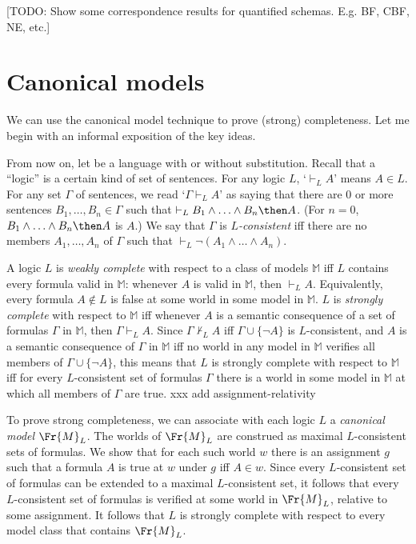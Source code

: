 \documentclass[11pt]{woarticle}
\theoremstyle{break}
\theoremstyle{nonumberplain}
\newcommand{\1}{\;\,|\;\,}
\begin{document}
[TODO: Show some correspondence results for quantified schemas. E.g. BF, CBF,
NE, etc.]




\section{Canonical models}\label{sec:canonical-models}

We can use the canonical model technique to prove (strong) completeness. Let me
begin with an informal exposition of the key ideas.

From now on, let  be a language with or without substitution. Recall that
a ``logic'' is a certain kind of set of sentences. For any logic $L$,
`$\vdash_{L} A$' means $A \in L$. For any set $\Gamma$ of sentences, we read
`$\Gamma \vdash_{L} A$' as saying that there are 0 or more sentences
$B_1,\ldots,B_n \in \Gamma$ such that
$\vdash_{L} B_1\land \ldots \land B_n \then A$. (For $n=0$,
$B_1\land\ldots \land B_n \then A$ is $A$.) We say that $\Gamma$ is
\emph{$L$-consistent} iff there are no members $A_1,\ldots,A_n$ of $\Gamma$ such
that $\vdash_L \neg (A_1 \land \ldots \land A_n)$.

A logic $L$ is \emph{weakly complete} with respect to a class of
models $\mathbb{M}$ iff $L$ contains every formula valid in
$\mathbb{M}$: whenever $A$ is valid in $\mathbb{M}$, then $\vdash_L
A$. Equivalently, every formula $A \not\in L$ is false at some world
in some model in $\mathbb{M}$.  $L$ is \emph{strongly complete} with
respect to $\mathbb{M}$ iff whenever $A$ is a semantic consequence of
a set of formulas $\Gamma$ in $\mathbb{M}$, then $\Gamma \vdash_L
A$. Since $\Gamma \not\vdash_L A$ iff $\Gamma \cup \{\neg A\}$ is
$L$-consistent, and $A$ is a semantic consequence of $\Gamma$ in
$\mathbb{M}$ iff no world in any model in $\mathbb{M}$ verifies all
members of $\Gamma \cup \{\neg A\}$, this means that $L$ is strongly
complete with respect to $\mathbb{M}$ iff for every $L$-consistent set
of formulas $\Gamma$ there is a world in some model in $\mathbb{M}$ at
which all members of $\Gamma$ are true. xxx add assignment-relativity

To prove strong completeness, we can associate with each logic $L$ a
\emph{canonical model} $\Fr{M}_L$. The worlds of $\Fr{M}_L$ are construed as
maximal $L$-consistent sets of formulas. We show that for each such world $w$
there is an assignment $g$ such that a formula $A$ is true at $w$ under $g$ iff
$A \in w$. Since every $L$-consistent set of formulas can be extended to a
maximal $L$-consistent set, it follows that every $L$-consistent set of formulas
is verified at some world in $\Fr{M}_L$, relative to some assignment. It follows
that $L$ is strongly complete with respect to every model class that contains
$\Fr{M}_L$.
\end{document}
